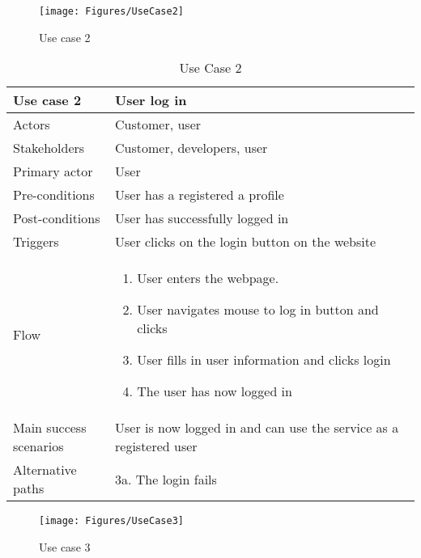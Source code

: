 \begin{figure}[H]
\centering
\texttt{[image: Figures/UseCase2]}
\caption{Use case 2}
    \label{fig:UC2}
    \end{figure}

\begin{table}[H]
\begin{tabular}{ | L{0.25\linewidth} | L{0.75\linewidth} | } 
 \hline {}
 Use case 2 & User log in  \\ 
 \hline
 Actors & Customer, user \\ 
 \hline
 Stakeholders & Customer, developers, user \\ 
  \hline
 Primary actor & User  \\ 
 \hline
 Pre-conditions & User has a registered a profile \\ 
 \hline
 Post-conditions & User has successfully logged in \\ 
  \hline
 Triggers & User clicks on the login button on the website  \\ 
 \hline
Flow & \begin{minipage}{5in}
    \vskip 1pt
    \begin{enumerate}
  \item User enters the webpage.
  \item User navigates mouse to log in button and clicks
  \item User fills in user information and clicks login
  \item The user has now logged in
   \end{enumerate}
   \vskip 4pt
 \end{minipage}\\ 
 \hline
 Main success scenarios & User is now logged in and can use the service as a registered user \\ 
 \hline
 Alternative paths & 3a. The login fails\\
 \hline
\end{tabular}
\caption{Use Case 2}
\end{table}

\begin{figure}[H]
\centering
\texttt{[image: Figures/UseCase3]}
\caption{Use case 3}
    \label{fig:UC3}
    \end{figure}

